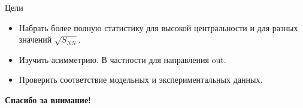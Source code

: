 \begin{frame}{Цели}
    \begin{itemize}
	\item  Набрать более полную статистику для высокой центральности и для разных значений $\sqrt{S_{NN}}$.
        \item Изучить асимметрию. В частности для направления out.
        \item Проверить соответствие модельных и экспериментальных данных.
    \end{itemize}
\end{frame}

\begin{frame}
	\Large \textbf{Спасибо за внимание!}
\end{frame}

